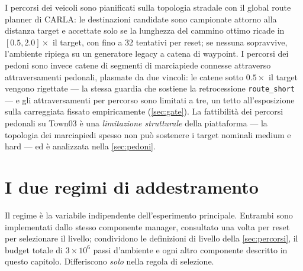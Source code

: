 I percorsi dei veicoli sono pianificati sulla topologia stradale con il
global route planner di CARLA: le destinazioni candidate sono campionate
attorno alla distanza target e accettate solo se la lunghezza del
cammino ottimo ricade in $[0.5, 2.0] \times$ il target, con fino a 32
tentativi per reset; se nessuna sopravvive, l'ambiente ripiega su un
generatore legacy a catena di waypoint. I percorsi dei pedoni sono
invece catene di segmenti di marciapiede connesse attraverso
attraversamenti pedonali, plasmate da due vincoli: le catene sotto
$0.5 \times$ il target vengono rigettate --- la stessa guardia che
sostiene la retrocessione \texttt{route\_short} --- e gli
attraversamenti per percorso sono limitati a tre, un tetto
all'esposizione sulla carreggiata fissato empiricamente
(\cref{sec:gate}). La fattibilità dei percorsi pedonali su Town03 è una
\emph{limitazione strutturale} della piattaforma --- la topologia dei
marciapiedi spesso non può sostenere i target nominali medium e hard ---
ed è analizzata nella \cref{sec:pedoni}.

\section{I due regimi di addestramento}
\label{sec:regimi}

Il regime è la variabile indipendente dell'esperimento principale.
Entrambi sono implementati dallo stesso componente manager, consultato
una volta per reset per selezionare il livello; condividono le
definizioni di livello della \cref{sec:percorsi}, il budget totale di
$3 \times 10^6$ passi d'ambiente e ogni altro componente descritto in
questo capitolo. Differiscono \emph{solo} nella regola di selezione.

